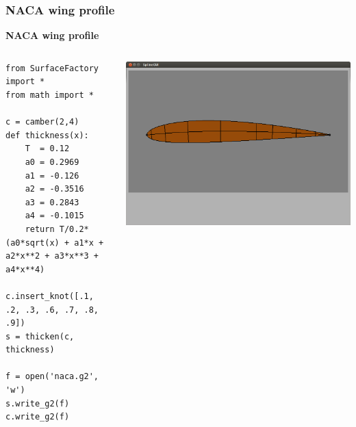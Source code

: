 \documentclass{beamer}
\theoremstyle{plain}
\theoremstyle{definition}
\begin{document}
\begin{frame}[fragile]
\frametitle{NACA wing profile}
\textbf{NACA wing profile}

\begin{columns}
    \begin{column}{.50\linewidth}
        \begin{listing}[H]
            \tiny
            \begin{verbatim}
from SurfaceFactory import *
from math import *

c = camber(2,4)
def thickness(x):
    T  = 0.12
    a0 = 0.2969
    a1 = -0.126
    a2 = -0.3516
    a3 = 0.2843
    a4 = -0.1015
    return T/0.2*(a0*sqrt(x) + a1*x + a2*x**2 + a3*x**3 + a4*x**4)
    
c.insert_knot([.1, .2, .3, .6, .7, .8, .9])
s = thicken(c, thickness)

f = open('naca.g2', 'w')
s.write_g2(f)
c.write_g2(f)

            \end{verbatim}
        \end{listing}
    \end{column}
    \begin{column}{.45\linewidth}
        \includegraphics[width=\linewidth]{naca2}
    \end{column}
\end{columns}
\end{frame}

\end{document}

